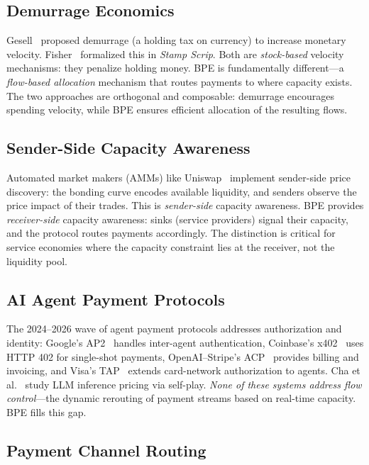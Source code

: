 \subsection{Demurrage Economics}

Gesell~\cite{gesell1916natural} proposed demurrage (a holding tax on currency) to
increase monetary velocity. Fisher~\cite{fisher1933stamp} formalized this in \emph{Stamp
Scrip}. Both are \emph{stock-based} velocity mechanisms: they penalize holding money.
BPE is fundamentally different---a \emph{flow-based allocation} mechanism that routes
payments to where capacity exists. The two approaches are orthogonal and composable:
demurrage encourages spending velocity, while BPE ensures efficient allocation of
the resulting flows.

\subsection{Sender-Side Capacity Awareness}

Automated market makers (AMMs) like Uniswap~\cite{adams2021uniswap} implement
sender-side price discovery: the bonding curve encodes available liquidity, and
senders observe the price impact of their trades. This is \emph{sender-side}
capacity awareness. BPE provides \emph{receiver-side} capacity awareness:
sinks (service providers) signal their capacity, and the protocol routes payments
accordingly. The distinction is critical for service economies where the capacity
constraint lies at the receiver, not the liquidity pool.

\subsection{AI Agent Payment Protocols}

The 2024--2026 wave of agent payment protocols addresses authorization and identity:
Google's AP2~\cite{google2025ap2} handles inter-agent authentication,
Coinbase's x402~\cite{coinbase2025x402} uses HTTP 402 for single-shot payments,
OpenAI--Stripe's ACP~\cite{openai2025acp} provides billing and invoicing, and
Visa's TAP~\cite{visa2025tap} extends card-network authorization to agents.
Cha et al.~\cite{cha2025stp} study LLM inference pricing via self-play.
\emph{None of these systems address flow control}---the dynamic rerouting of
payment streams based on real-time capacity. BPE fills this gap.

\subsection{Payment Channel Routing}


